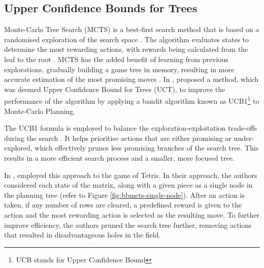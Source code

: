 \documentclass[a4paper, 12pt]{extreport}
\begin{document}
			\subsection{Upper Confidence Bounds for Trees}
				Monte-Carlo Tree Search (MCTS) is a best-first search method that is based on a randomised exploration of the search space \cite{mcts}. The algorithm evaluates states to determine the most rewarding actions, with rewards being calculated from the leaf to the root \cite{tetris-bb-mc-planning}. MCTS has the added benefit of learning from previous explorations, gradually building a game tree in memory, resulting in more accurate estimation of the most promising moves \cite{mcts}. In \citeyear{bandit-based-mcts}, \citeauthor{bandit-based-mcts} \cite{bandit-based-mcts} proposed a method, which was deemed Upper Confidence Bound for Trees (UCT), to improve the performance of the algorithm by applying a bandit algorithm known as UCB1\footnote{UCB stands for Upper Confidence Bound} to Monte-Carlo Planning. 
				
				The UCB1 formula is employed to balance the exploration-exploitation trade-offs during the search \cite{tetris-bb-mc-planning}. It helps prioritise actions that are either promising or under-explored, which effectively prunes less promising branches of the search tree. This results in a more efficient search process and a smaller, more focused tree.
				
				In \citeyear{tetris-bb-mc-planning}, \citeauthor{tetris-bb-mc-planning} \cite{tetris-bb-mc-planning} employed this approach to the game of Tetris. In their approach, the authors considered each state of the matrix, along with a given piece as a single node in the planning tree (refer to Figure \ref{fig:bbmcts-single-node}). After an action is taken, if any number of rows are cleared, a predefined reward is given to the action and the most rewarding action is selected as the resulting move. To further improve efficiency, the authors pruned the search tree further, removing actions that resulted in disadvantageous holes in the field.
				
\end{document}
